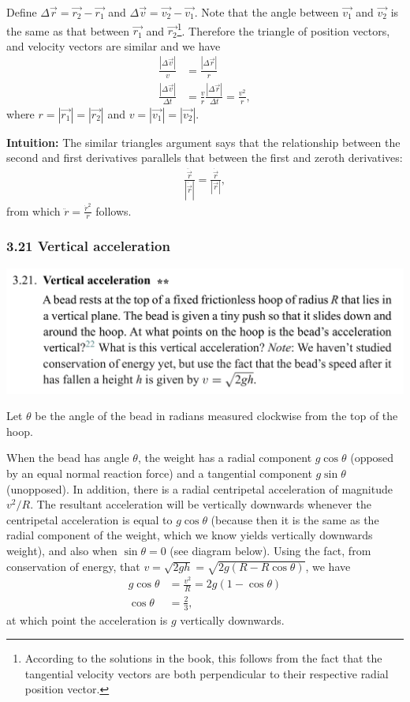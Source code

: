 Define $\Delta \vec{r} = \vec{r_2} - \vec{r_1}$ and $\Delta \vec{v} = \vec{v_2} - \vec{v_1}$.  Note
that the angle between $\vec{v_1}$ and $\vec{v_2}$ is the same as that between $\vec{r_1}$ and
$\vec{r_2}$\footnote{According to the solutions in the book, this follows from the fact that the
  tangential velocity vectors are both perpendicular to their respective radial position
  vector.}. Therefore the triangle of position vectors, and velocity vectors are similar and we have
\begin{align*}
  \frac{|\Delta \vec{v}|}{v} &= \frac{|\Delta \vec{r}|}{r} \\
  \frac{|\Delta \vec{v}|}{\Delta t} &= \frac{v}{r}\frac{|\Delta \vec{r}|}{\Delta t} = \frac{v^2}{r},
\end{align*}
where $r = |\vec{r_1}| = |\vec{r_2}|$ and $v = |\vec{v_1}| = |\vec{v_2}|$.

{\bf Intuition:} The similar triangles argument says that the relationship between the second and
first derivatives parallels that between the first and zeroth derivatives:
\begin{align*}
  \frac{\ddot{\vec{r}}}{|\dot{\vec{r}}|} = \frac{\dot{\vec{r}}}{|\vec{r}|},
\end{align*}
from which $\ddot{r} = \frac{\dot{r}^2}{r}$ follows.


\subsubsection*{3.21 Vertical acceleration}
\begin{mdframed}
  \includegraphics[width=400pt]{img/physics--classical-mechanics--morin--3-21.png}
\end{mdframed}

Let $\theta$ be the angle of the bead in radians measured clockwise from the top of the hoop.

When the bead has angle $\theta$, the weight has a radial component $g\cos\theta$ (opposed by an
equal normal reaction force) and a tangential component $g\sin\theta$ (unopposed). In addition,
there is a radial centripetal acceleration of magnitude $v^2/R$. The resultant acceleration will be
vertically downwards whenever the centripetal acceleration is equal to $g\cos\theta$ (because then
it is the same as the radial component of the weight, which we know yields vertically downwards
weight), and also when $\sin\theta=0$ (see diagram below). Using the fact, from conservation of
energy, that $v = \sqrt{2gh} = \sqrt{2g(R - R\cos\theta)}$, we have
\begin{align*}
  g\cos\theta  &= \frac{v^2}{R} =2g(1 - \cos\theta)\\
  \cos\theta &= \frac{2}{3},
\end{align*}
at which point the acceleration is $g$ vertically downwards.

